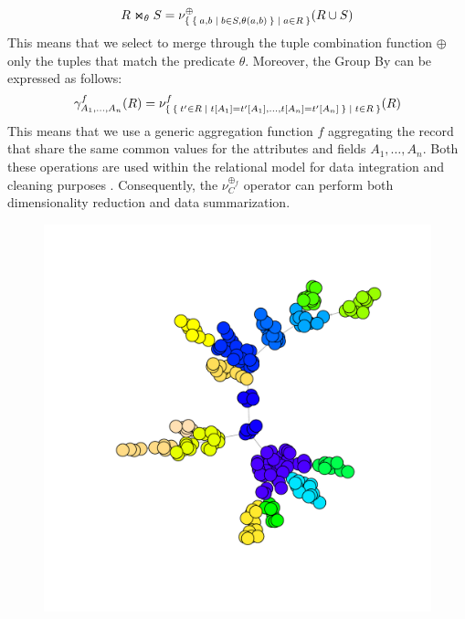 \[R\Join_\theta S=\nu^\oplus_{\Set{\Set{a,b|b\in S, \theta(a,b)}|a\in R}}(R\cup S)\]
This means that we select to merge through the tuple combination function $\oplus$ only the tuples that match the predicate $\theta$. Moreover, the Group By can be expressed as follows:
\[\gamma^f_{A_1,\dots,A_n}(R)=\nu^f_{\Set{\Set{t'\in R|t[A_1]=t'[A_1],\dots,t[A_n]=t'[A_n]}|t\in R}}(R)\]
This means that we use a generic aggregation function $f$ aggregating the record that share the same common values for the attributes and fields $A_1,\dots,A_n$. Both these operations are used within the relational model for data integration and cleaning purposes \cite{deII}. Consequently, the $\nu_C^{\oplus_f}$ operator can perform both dimensionality reduction and data summarization. 
\begin{figure}[!tp]
	\centering
	\begin{minipage}[!h]{0.7\textwidth}
	\centering
		\includegraphics[width=\textwidth]{fig/01dataint/friendgraph}
		\label{fig:communities}
	\end{minipage}
	\begin{minipage}[!h]{0.7\textwidth}
	\centering

\end{minipage}
\end{figure}
